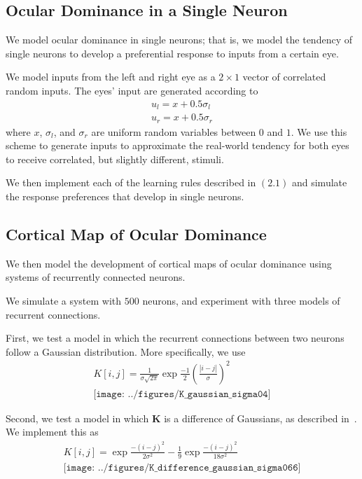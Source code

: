 \documentclass[pageno]{mat323paper}
\begin{document}
\subsection{Ocular Dominance in a Single Neuron}
We model ocular dominance in single neurons; that is, we model the tendency of single neurons to develop a preferential response to inputs from a certain eye.

We model inputs from the left and right eye as a $2\times1$ vector of correlated random inputs. The eyes' input are generated according to
\begin{align}
u_l=x+0.5\sigma_l\\
u_r=x+0.5\sigma_r
\end{align}
where $x$, $\sigma_l$, and $\sigma_r$ are uniform random variables between $0$ and $1$. We use this scheme to generate inputs to approximate the real-world tendency for both eyes to receive correlated, but slightly different, stimuli. %

We then implement each of the learning rules described in $(2.1)$ and simulate the response preferences that develop in single neurons.

\subsection{Cortical Map of Ocular Dominance}
We then model the development of cortical maps of ocular dominance using systems of recurrently connected neurons.

We simulate a system with $500$ neurons, and experiment with three models of recurrent connections.

First, we test a model in which the recurrent connections between two neurons follow a Gaussian distribution. More specifically, we use
\begin{align}
K[i,j]=\frac{1}{\sigma\sqrt{2\pi}}\exp{\frac{-1}{2}(\frac{|i-j|}{\sigma})^2}\\
\texttt{[image: ../figures/K\_gaussian\_sigma04]}
\end{align}

Second, we test a model in which $\mathbf{K}$ is a difference of Gaussians, as described in~\cite{dayan_theoretical_2000}. We implement this as
\begin{align}
K[i,j]=\exp{\frac{-(i-j)^2}{2\sigma^2}}-\frac{1}{9}\exp{\frac{-(i-j)^2}{18\sigma^2}}\\
\texttt{[image: ../figures/K\_difference\_gaussian\_sigma066]}
\end{align}
\end{document}
